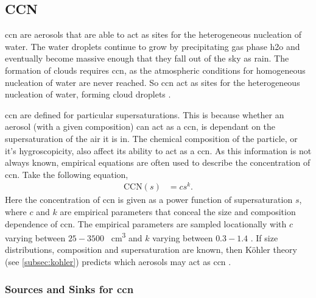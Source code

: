 

		\subsection{CCN}
		\label{subsec:ccn}

		\gls{ccn} are aerosols that are able to act as sites for the heterogeneous nucleation of water. The water droplets continue to grow by precipitating gas phase \gls{h2o} and eventually become massive enough that they fall out of the sky as rain. The formation of clouds requires \gls{ccn}, as the atmospheric conditions for homogeneous nucleation of water are never reached. So \gls{ccn} act as sites for the heterogeneous nucleation of water, forming cloud droplets \citep[Chapter 17]{seinfeld2012atmospheric}. 

		\gls{ccn} are defined for particular supersaturations. This is because whether an aerosol (with a given composition) can act as a \gls{ccn}, is dependant on the supersaturation of the air it is in. The chemical composition of the particle, or it's hygroscopicity, also affect its ability to act as a \gls{ccn}. As this information is not always known, empirical equations are often used to describe the concentration of \gls{ccn}. Take the following equation,
		\begin{align}
			\label{eq:ccnemp}
			\mathrm{CCN}(s) &= cs^k.
		\end{align}
		Here the concentration of \gls{ccn} is given as a power function of supersaturation $s$, where $c$ and $k$ are empirical parameters that conceal the size and composition dependence of \gls{ccn}. The empirical parameters are sampled locationally with $c$ varying between $25 - 3500$ \si{\per\cubic\centi\metre} and $k$ varying between $0.3 - 1.4$ \citep[Chapter 17]{seinfeld2012atmospheric}. If size distributions, composition and supersaturation are known, then K\"{o}hler theory (see \cref{subsec:kohler}) predicts which aerosols may act as \gls{ccn} \citep{rissman:2006ha}.

		\subsubsection{Sources and Sinks for \gls{ccn}}

